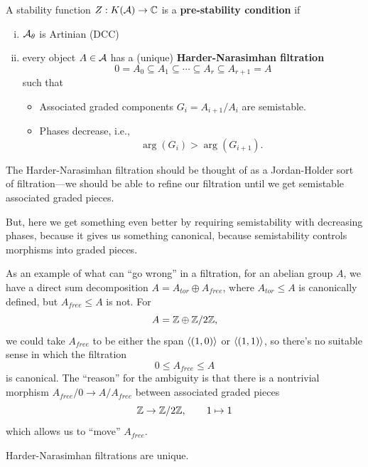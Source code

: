 \documentclass[12pt]{article}
\begin{document}
\begin{defn}
    A stability function $Z: K(\mathcal{A}) \to \mathbb{C}$ is a \textbf{pre-stability condition} if
    \begin{enumerate}[(i)]
        \item $\mathcal{A}_\theta$ is Artinian (DCC)
        \item every object $A\in \mathcal{A}$ has a (unique) \textbf{Harder-Narasimhan filtration}
        \[0 = A_0 \subseteq A_1 \subseteq \cdots \subseteq A_r \subseteq A_{r+1} = A\]
        such that
        \begin{itemize}
            \item Associated graded components $G_i = A_{i+1}/A_i$ are semistable.
            \item Phases decrease, i.e.,
            \[\arg(G_i) > \arg(G_{i+1}).\]
        \end{itemize}
    \end{enumerate}
\end{defn}

\begin{rmk}
    The Harder-Narasimhan filtration should be thought of as a Jordan-Holder sort of filtration---we should be able to refine our filtration until we get semistable associated graded pieces.
    
    But, here we get something even better by requiring semistability with decreasing phases, because it gives us something canonical, because semistability controls morphisms into graded pieces.
\end{rmk}

\begin{eg}
    As an example of what can ``go wrong'' in a filtration, for an abelian group $A$, we have a direct sum decomposition $A = A_{tor} \oplus A_{free}$, where $A_{tor}\leq A$ is canonically defined, but $A_{free}\leq A$ is not. For
    \[A = \mathbb{Z} \oplus \mathbb{Z}/2\mathbb{Z},\]
    we could take $A_{free}$ to be either the span $\left\langle(1,0)\right\rangle$ or $\left\langle(1,1)\right\rangle$, so there's no suitable sense in which the filtration
    \[0 \leq A_{free} \leq A\]
    is canonical. The ``reason'' for the ambiguity is that there is a nontrivial morphism $A_{free}/0 \to A/A_{free}$ between associated graded pieces
    \[\mathbb{Z} \to \mathbb{Z}/2\mathbb{Z}, \qquad 1\mapsto 1\]
    which allows us to ``move'' $A_{free}$.
\end{eg}

\begin{prop}
    Harder-Narasimhan filtrations are unique.
\end{prop}
\end{document}
